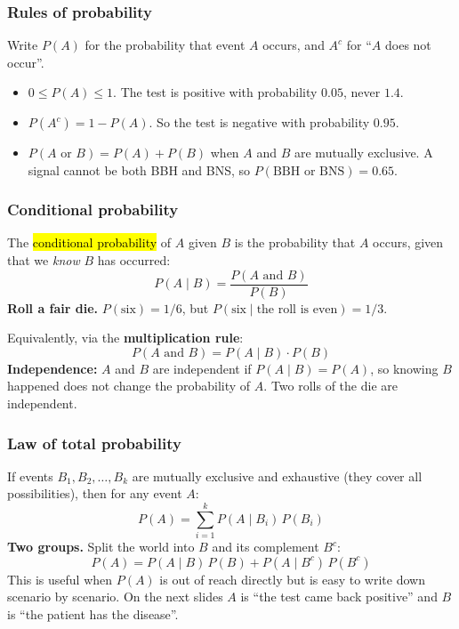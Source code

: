 \documentclass[slidestop,compress,mathserif]{beamer}
\begin{document}
\begin{frame}
\frametitle{Rules of probability}

Write $P(A)$ for the probability that event $A$ occurs, and $A^c$ for ``$A$ does not occur''.

\pause
\medskip

\begin{itemize}
\item $0 \le P(A) \le 1$. \quad The test is positive with probability $0.05$, never $1.4$.
\pause
\item $P(A^c) = 1 - P(A)$. \quad So the test is negative with probability $0.95$.
\pause
\item $P(A \text{ or } B) = P(A) + P(B)$ when $A$ and $B$ are mutually exclusive. \quad A signal cannot be both BBH and BNS, so $P(\text{BBH or BNS}) = 0.65$.
\end{itemize}

\end{frame}

\begin{frame}
\frametitle{Conditional probability}

The \hl{conditional probability} of $A$ given $B$ is the probability that $A$ occurs, given that we \textit{know} $B$ has occurred:
\[
P(A \mid B) = \frac{P(A \text{ and } B)}{P(B)}
\]
\pause
\medskip
\textbf{Roll a fair die.} $P(\text{six}) = 1/6$, but $P(\text{six} \mid \text{the roll is even}) = 1/3$.

\pause
\medskip
Equivalently, via the \textbf{multiplication rule}:
\[
P(A \text{ and } B) = P(A \mid B) \cdot P(B)
\]
\pause
\textbf{Independence:} $A$ and $B$ are independent if $P(A \mid B) = P(A)$, so knowing $B$ happened does not change the probability of $A$. Two rolls of the die are independent.

\end{frame}

\begin{frame}
\frametitle{Law of total probability}

If events $B_1, B_2, \ldots, B_k$ are mutually exclusive and exhaustive (they cover all possibilities), then for any event $A$:
\[
P(A) = \sum_{i=1}^{k} P(A \mid B_i)\, P(B_i)
\]
\pause
\medskip
\textbf{Two groups.} Split the world into $B$ and its complement $B^c$:
\[
P(A) = P(A \mid B)\,P(B) + P(A \mid B^c)\,P(B^c)
\]
\pause
\medskip
This is useful when $P(A)$ is out of reach directly but is easy to write down scenario by scenario. On the next slides $A$ is ``the test came back positive'' and $B$ is ``the patient has the disease''.

\end{frame}
\end{document}
